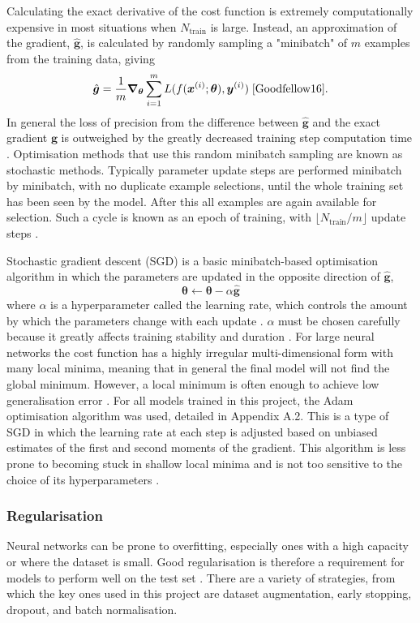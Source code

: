 \documentclass[12pt]{article}
\begin{document}
Calculating the exact derivative of the cost function is extremely computationally expensive in most situations when $N_{\mathrm{train}}$ is large. Instead, an approximation of the gradient, $\hat{\bm{g}}$, is calculated by randomly sampling a "minibatch" of $m$ examples from the training data, giving
\begin{equation}
\hat{\bm{g}}=\frac{1}{m}\bm\nabla_{\bm\theta}\sum_{i=1}^mL(f(\bm{x}^{(i)};\bm\theta),\bm{y}^{(i)})\;\cite{Goodfellow16}.
\end{equation}
In general the loss of precision from the difference between $\hat{\bm{g}}$ and the exact gradient $\bm{g}$ is outweighed by the greatly decreased training step computation time \cite{Goodfellow16}. Optimisation methods that use this random minibatch sampling are known as stochastic methods. Typically parameter update steps are performed minibatch by minibatch, with no duplicate example selections, until the whole training set has been seen by the model. After this all examples are again available for selection. Such a cycle is known as an epoch of training, with $\lfloor N_{\mathrm{train}}/m\rfloor$ update steps \cite{Goodfellow16}.

Stochastic gradient descent (SGD) is a basic minibatch-based optimisation algorithm in which the parameters are updated in the opposite direction of $\hat{\bm{g}}$,
\begin{equation}
\bm\theta\leftarrow\bm\theta-\alpha\hat{\bm{g}}
\end{equation}
where $\alpha$ is a hyperparameter called the learning rate, which controls the amount by which the parameters change with each update \cite{Amari93}. $\alpha$ must be chosen carefully because it greatly affects training stability and duration \cite{Goodfellow16}. For large neural networks the cost function has a highly irregular multi-dimensional form with many local minima, meaning that in general the final model will not find the global minimum. However, a local minimum is often enough to achieve low generalisation error \cite{Goodfellow16}. For all models trained in this project, the Adam optimisation algorithm was used, detailed in Appendix A.2. This is a type of SGD in which the learning rate at each step is adjusted based on unbiased estimates of the first and second moments of the gradient. This algorithm is less prone to becoming stuck in shallow local minima and is not too sensitive to the choice of its hyperparameters \cite{Kingma14}. 

\subsubsection{Regularisation}
Neural networks can be prone to overfitting, especially ones with a high capacity or where the dataset is small. Good regularisation is therefore a requirement for models to perform well on the test set \cite{Goodfellow16}. There are a variety of strategies, from which the key ones used in this project are dataset augmentation, early stopping, dropout, and batch normalisation.
\end{document}
